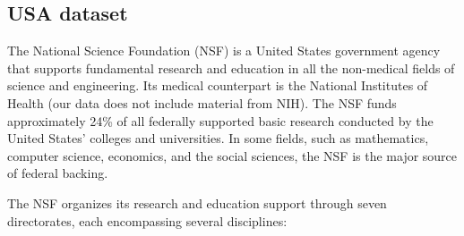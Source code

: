 \documentclass[12pt]{report}
\begin{document}
\subsection{USA dataset}

The National Science Foundation (NSF) is a United States government
agency that supports fundamental research and education in all the
non-medical fields of science and engineering. Its medical counterpart
is the National Institutes of Health (our data does not include 
material from NIH). The NSF funds approximately 24\% of all
federally supported basic research conducted by the United States'
colleges and universities. In some fields, such as mathematics,
computer science, economics, and the social sciences, the NSF is the
major source of federal backing.

 
The NSF organizes its research and education support through seven 
directorates, each encompassing several disciplines:
\end{document}
